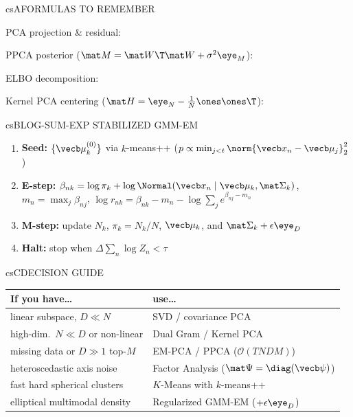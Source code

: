 \documentclass[../../../../master.tex]{subfiles}
\begin{document}
\begin{cscolumns}
\begin{cscard}{csA}{FORMULAS TO REMEMBER}
  \begin{csbul}
    \item PCA projection \& residual:
    \item PPCA posterior ($\mat M = \mat W\T\mat W + \sigma^2\eye_M$):
    \item ELBO decomposition:
    \item Kernel PCA centering ($\mat H = \eye_N - \frac{1}{N}\ones\ones\T$):
  \end{csbul}
\end{cscard}

\begin{cscard}{csB}{LOG-SUM-EXP STABILIZED GMM-EM}
  \begin{enumerate}[leftmargin=1.2em, itemsep=1pt, topsep=1pt, parsep=0pt]
    \item \textbf{Seed:} $\{\vecb\mu_k^{(0)}\}$ via $k$-means++ ($p\propto \min_{j<t}\norm{\vecb x_n-\vecb\mu_j}_2^2$)
    \item \textbf{E-step:} $\beta_{nk}=\log\pi_k+\log\Normal(\vecb x_n\mid\vecb\mu_k,\mat\Sigma_k)$, $m_n=\max_j\beta_{nj}$, $\log r_{nk}=\beta_{nk}-m_n-\log\sum_j e^{\beta_{nj}-m_n}$
    \item \textbf{M-step:} update $N_k$, $\pi_k=N_k/N$, $\vecb\mu_k$, and $\mat\Sigma_k + \epsilon\eye_D$
    \item \textbf{Halt:} stop when $\Delta\sum_n\log Z_n < \tau$
  \end{enumerate}
\end{cscard}
\columnbreak

\begin{cscard}{csC}{DECISION GUIDE}
  \renewcommand{\arraystretch}{1.22}\small
  \begin{tabular}{@{}>{\raggedright\arraybackslash}p{3.1cm}>{\raggedright\arraybackslash}p{4.6cm}@{}}
    \textbf{If you have\ldots} & \textbf{use\ldots}\\ \hline
    linear subspace, $D\ll N$ & SVD / covariance PCA\\
    high-dim.\ $N\ll D$ or non-linear & Dual Gram / Kernel PCA\\
    missing data or $D\gg 1$ top-$M$ & EM-PCA / PPCA ($\mathcal O(TNDM)$)\\
    heteroscedastic axis noise & Factor Analysis ($\mat\Psi=\diag(\vecb\psi)$)\\
    fast hard spherical clusters & $K$-Means with $k$-means++\\
    elliptical multimodal density & Regularized GMM-EM ($+\epsilon\eye_D$)\\
  \end{tabular}
\end{cscard}


\end{cscolumns}
\end{document}
